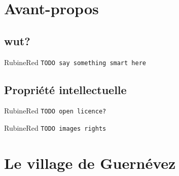 \documentclass[a4paper, french, openany, 12pt]{book}
\title{
  \vspace*{-8cm}

  \fullwidthimage{images/cover.jpg}

  \vspace*{5cm}

  \bsc{Developer skills framework}

  \todo{Your daily RPG}
}
\author{Sébastien Carceles}
\date{}
\newcommand{\todo}[1]{
  \begin{color}{RubineRed}
    \texttt{TODO {#1}}
  \end{color}
}
\begin{document}
\begin{titlepage}
  \maketitle
\end{titlepage}

\frontmatter

\chapter{Avant-propos}

\section*{wut?}

\todo{say something smart here}


\section*{Propriété intellectuelle}

\todo{open licence?}

\todo{images rights}

\mainmatter

\chapter{Le village de Guernévez}


\backmatter

\tableofcontents
\end{document}
